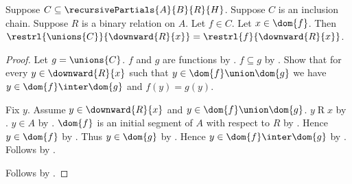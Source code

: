 \begin{lemma}\label{recursive_partial_union_restriction}
    Suppose $C\subseteq\recursivePartials{A}{B}{R}{H}$.
    Suppose $C$ is an inclusion chain.
    Suppose $R$ is a binary relation on $A$.
    Let $f\in C$.
    Let $x\in\dom{f}$.
    Then
        $\restrl{\unions{C}}{\downward{R}{x}}
        =\restrl{f}{\downward{R}{x}}$.
\end{lemma}
\begin{proof}
    Let $g=\unions{C}$.
    $f$ and $g$ are functions
        by .
    $f\subseteq g$ by .
    Show that for every $y\in\downward{R}{x}$ such that
        $y\in\dom{f}\union\dom{g}$ we have
        $y\in\dom{f}\inter\dom{g}$ and $f(y)=g(y)$.
    \begin{subproof}
        Fix $y$.
        Assume $y\in\downward{R}{x}$ and $y\in\dom{f}\union\dom{g}$.
        $y\mathrel{R}x$ by .
        $y\in A$ by .
        $\dom{f}$ is an initial segment of $A$ with respect to $R$
            by .
        Hence $y\in\dom{f}$ by .
        Thus $y\in\dom{g}$ by .
        Hence $y\in\dom{f}\inter\dom{g}$ by .
        Follows by .
    \end{subproof}
    Follows by .
\end{proof}

